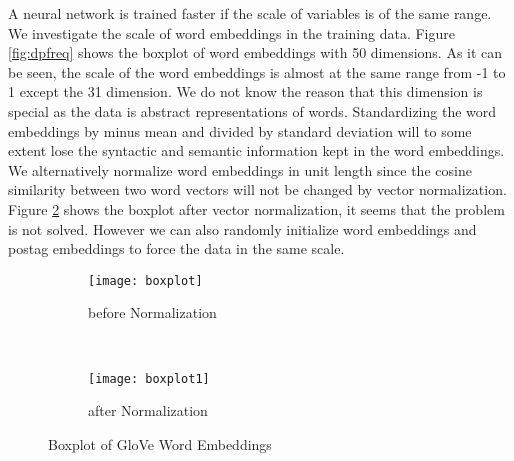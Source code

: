 A neural network is trained faster if the scale of variables is of the same range. We investigate the scale of word embeddings in the training data. Figure \ref{fig:dpfreq} shows the boxplot of word embeddings with 50 dimensions. As it can be seen, the scale of the word embeddings is almost at the same range from -1 to 1 except the 31 dimension. We do not know the reason that this dimension is special as the data is abstract representations of words. Standardizing the word embeddings by minus mean and divided by standard deviation will to some extent lose the syntactic and semantic information kept in the word embeddings. We alternatively normalize word embeddings in unit length since the cosine similarity between two word vectors will not be changed by vector normalization. Figure \ref{fig:boxplot1} shows the boxplot after vector normalization, it seems that the problem is not solved. However we can also randomly initialize word embeddings and postag embeddings to force the data in the same scale.

\begin{figure}
    \centering
    \begin{subfigure}[b]{0.49\textwidth}
        \texttt{[image: boxplot]}
        \caption{before Normalization}
        \label{fig:boxplot}
    \end{subfigure}
    ~
    \begin{subfigure}[b]{0.49\textwidth}
        \texttt{[image: boxplot1]}
        \caption{after Normalization}
        \label{fig:boxplot1}
    \end{subfigure}
    \caption{Boxplot of GloVe Word Embeddings}\label{fig:boxemb}
\end{figure}

